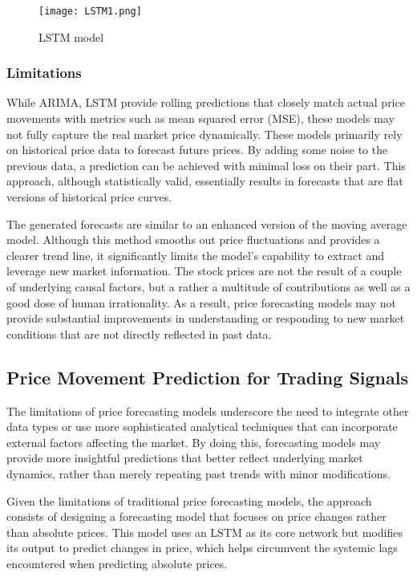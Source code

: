 \documentclass[conference]{IEEEtran}
\begin{document}
\begin{figure}[tb]
\centerline{\texttt{[image: LSTM1.png]}}
\caption{LSTM model \cite{b6}}
\label{fig}
\end{figure}
\subsubsection{Limitations} 

While ARIMA, LSTM provide rolling predictions that closely match actual price movements with metrics such as mean squared error (MSE), these models may not fully capture the real market price dynamically. These models primarily rely on historical price data to forecast future prices. By adding some noise to the previous data, a prediction can be achieved with minimal loss on their part. This approach, although statistically valid, essentially results in forecasts that are flat versions of historical price curves.

The generated forecasts are similar to an enhanced version of the moving average model. Although this method smooths out price fluctuations and provides a clearer trend line, it significantly limits the model’s capability to extract and leverage new market information. The stock prices are not the result of a couple of underlying causal factors, but a rather a multitude of contributions as well as a good dose of human irrationality. As a result, price forecasting models may not provide substantial improvements in understanding or responding to new market conditions that are not directly reflected in past data.


\subsection{Price Movement Prediction for Trading Signals}
The limitations of price forecasting models underscore the need to integrate other data types or use more sophisticated analytical techniques that can incorporate external factors affecting the market. By doing this, forecasting models may provide more insightful predictions that better reflect underlying market dynamics, rather than merely repeating past trends with minor modifications.

Given the limitations of traditional price forecasting models, the approach consists of designing a forecasting model that focuses on price changes rather than absolute prices. This model uses an LSTM as its core network but modifies its output to predict changes in price, which helps circumvent the systemic lags encountered when predicting absolute prices.
\end{document}
